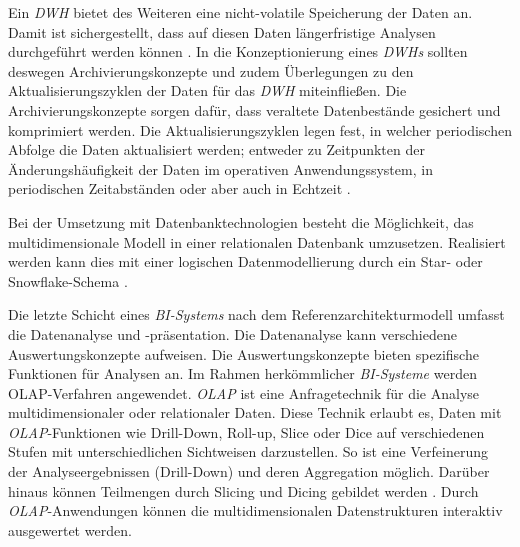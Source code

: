 Ein \textit{\acrlong{DWH}} bietet des Weiteren eine nicht-volatile Speicherung der Daten an. Damit ist sichergestellt, dass auf diesen Daten längerfristige Analysen durchgeführt werden können \cite[vgl.][136]{linden_geschaftsmodellbasierte_2016}.
In die Konzeptionierung eines \textit{\acrlong{DWH}s} sollten deswegen Archivierungskonzepte und zudem Überlegungen zu den Aktualisierungszyklen der Daten für das \textit{\acrshort{DWH}}
miteinfließen. Die Archivierungskonzepte sorgen dafür, dass veraltete Datenbestände gesichert und komprimiert werden.
Die Aktualisierungszyklen legen fest, in welcher periodischen Abfolge die Daten aktualisiert werden; entweder zu Zeitpunkten der Änderungshäufigkeit
der Daten im operativen Anwendungssystem, in periodischen Zeitabständen oder aber auch in Echtzeit \cite[vgl.][137]{linden_geschaftsmodellbasierte_2016}.

Bei der Umsetzung mit Datenbanktechnologien besteht die Möglichkeit, das multidimensionale Modell in einer relationalen Datenbank umzusetzen.  
Realisiert werden kann dies mit einer logischen Datenmodellierung durch ein Star- oder Snowflake-Schema \cite[vgl.][177 f.]{linden_geschaftsmodellbasierte_2016}.




Die letzte Schicht eines \textit{\acrshort{BI}-Systems} nach dem Referenzarchitekturmodell umfasst die Datenanalyse und -präsentation. Die Datenanalyse kann verschiedene Auswertungskonzepte aufweisen.
Die Auswertungskonzepte bieten spezifische Funktionen für Analysen an. Im Rahmen herkömmlicher \textit{\acrshort{BI}-Systeme} werden \acrfull{OLAP}-Verfahren angewendet. 
\textit{\acrshort{OLAP}} ist eine Anfragetechnik für die Analyse multidimensionaler oder relationaler Daten. Diese Technik erlaubt es, Daten mit \textit{\acrshort{OLAP}}-Funktionen 
wie Drill-Down, Roll-up, Slice oder Dice auf verschiedenen Stufen mit unterschiedlichen Sichtweisen darzustellen. So ist eine Verfeinerung der Analyseergebnissen (Drill-Down) und 
deren Aggregation möglich. Darüber hinaus können Teilmengen durch Slicing und Dicing gebildet werden \cite[vgl.][283 f.]{abts_grundkurs_2017}. 
Durch \textit{\acrshort{OLAP}}-Anwendungen können die multidimensionalen Datenstrukturen interaktiv ausgewertet werden.

